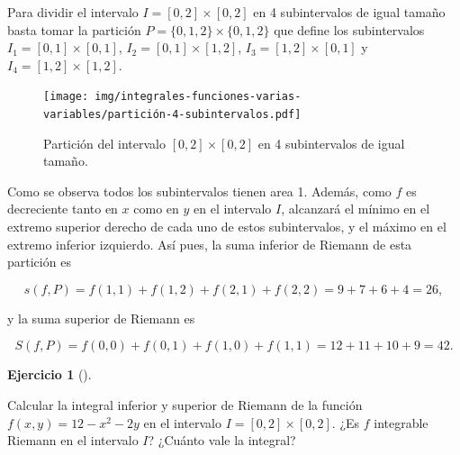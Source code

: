 \documentclass[
  a4paper,
]{scrreport}
\theoremstyle{definition}
\newtheorem{exercise}{Ejercicio}[chapter]
\theoremstyle{remark}
\begin{document}
\begin{tcolorbox}[enhanced jigsaw, toprule=.15mm, coltitle=black, colframe=quarto-callout-tip-color-frame, leftrule=.75mm, breakable, left=2mm, opacitybacktitle=0.6, colbacktitle=quarto-callout-tip-color!10!white, bottomrule=.15mm, opacityback=0, title=\textcolor{quarto-callout-tip-color}{\faLightbulb}\hspace{0.5em}{Solución}, bottomtitle=1mm, toptitle=1mm, titlerule=0mm, colback=white, arc=.35mm, rightrule=.15mm]

Para dividir el intervalo \(I=[0,2]\times[0,2]\) en 4 subintervalos de
igual tamaño basta tomar la partición \(P=\{0,1,2\}\times\{0,1,2\}\) que
define los subintervalos \(I_1=[0,1]\times [0,1]\),
\(I_2=[0,1]\times [1,2]\), \(I_3=[1,2]\times [0,1]\) y
\(I_4=[1,2]\times [1,2]\).

\begin{figure}[H]

{\centering \texttt{[image: img/integrales-funciones-varias-variables/partición-4-subintervalos.pdf]}

}

\caption{Partición del intervalo \([0,2]\times [0,2]\) en 4
subintervalos de igual tamaño.}

\end{figure}

Como se observa todos los subintervalos tienen area 1. Además, como
\(f\) es decreciente tanto en \(x\) como en \(y\) en el intervalo \(I\),
alcanzará el mínimo en el extremo superior derecho de cada uno de estos
subintervalos, y el máximo en el extremo inferior izquierdo. Así pues,
la suma inferior de Riemann de esta partición es

\[
s(f,P) 
= f(1,1) + f(1,2) + f(2,1) + f(2,2)
= 9 + 7 + 6 + 4
= 26,
\]

y la suma superior de Riemann es

\[
S(f,P) 
= f(0,0) + f(0,1) + f(1,0) + f(1,1)
= 12 + 11 + 10 + 9 
= 42.
\]

\end{tcolorbox}

\begin{exercise}[]\protect\hypertarget{exr-integral-inferior-superior-riemann-n-dimensional}{}\label{exr-integral-inferior-superior-riemann-n-dimensional}

Calcular la integral inferior y superior de Riemann de la función
\(f(x,y)=12-x^2-2y\) en el intervalo \(I=[0,2]\times[0,2]\). ¿Es \(f\)
integrable Riemann en el intervalo \(I\)? ¿Cuánto vale la integral?

\end{exercise}
\end{document}
